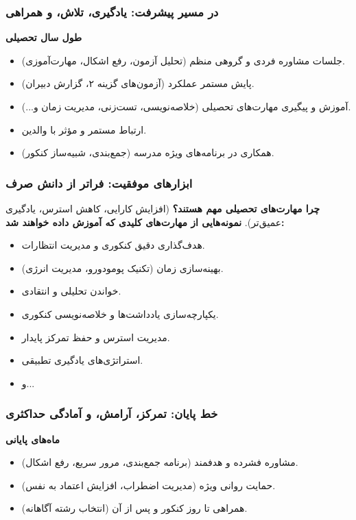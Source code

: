 \documentclass[aspectratio=169]{beamer}
\begin{document}
\begin{frame}[fragile]
  \frametitle{در مسیر پیشرفت: یادگیری، تلاش، و همراهی}
  \textbf{طول سال تحصیلی}
  \begin{itemize}
    \item جلسات مشاوره فردی و گروهی منظم (تحلیل آزمون، رفع اشکال، مهارت‌آموزی).
    \item پایش مستمر عملکرد (آزمون‌های گزینه ۲، گزارش دبیران).
    \item آموزش و پیگیری مهارت‌های تحصیلی (خلاصه‌نویسی، تست‌زنی، مدیریت زمان و...).
    \item ارتباط مستمر و مؤثر با والدین.
    \item همکاری در برنامه‌های ویژه مدرسه (جمع‌بندی، شبیه‌ساز کنکور).
  \end{itemize}
\end{frame}

\begin{frame}[fragile]
  \frametitle{ابزارهای موفقیت: فراتر از دانش صرف}
  \textbf{چرا مهارت‌های تحصیلی مهم هستند؟} (افزایش کارایی، کاهش استرس، یادگیری عمیق‌تر).
  \medskip
  \textbf{نمونه‌هایی از مهارت‌های کلیدی که آموزش داده خواهند شد:}
  \begin{itemize}
    \item هدف‌گذاری دقیق کنکوری و مدیریت انتظارات.
    \item بهینه‌سازی زمان (تکنیک پومودورو، مدیریت انرژی).
    \item خواندن تحلیلی و انتقادی.
    \item یکپارچه‌سازی یادداشت‌ها و خلاصه‌نویسی کنکوری.
    \item مدیریت استرس و حفظ تمرکز پایدار.
    \item استراتژی‌های یادگیری تطبیقی.
    \item و...
  \end{itemize}
\end{frame}

\begin{frame}[fragile]
  \frametitle{خط پایان: تمرکز، آرامش، و آمادگی حداکثری}
  \textbf{ماه‌های پایانی}
  \begin{itemize}
    \item مشاوره فشرده و هدفمند (برنامه جمع‌بندی، مرور سریع، رفع اشکال).
    \item حمایت روانی ویژه (مدیریت اضطراب، افزایش اعتماد به نفس).
    \item همراهی تا روز کنکور و پس از آن (انتخاب رشته آگاهانه).
  \end{itemize}
\end{frame}
\end{document}

